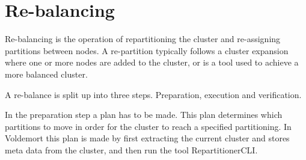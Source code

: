 \section{Re-balancing}
Re-balancing is the operation of repartitioning the cluster and re-assigning partitions between nodes. A re-partition typically follows a cluster expansion where one or more nodes are added to the cluster, or is a tool used to achieve a more balanced cluster. 

A re-balance is split up into three steps. Preparation, execution and verification.

In the preparation step a plan has to be made. This plan determines which partitions to move in order for the cluster to reach a specified partitioning. In Voldemort this plan is made by first extracting the current cluster and stores meta data from the cluster, and then run the tool RepartitionerCLI. 




